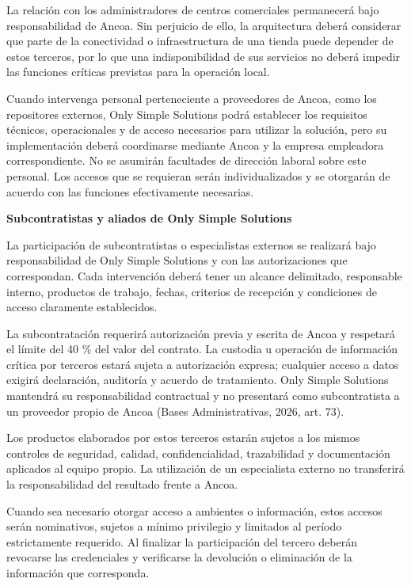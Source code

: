 \documentclass[11pt]{article}
\begin{document}
La relación con los administradores de centros comerciales permanecerá
bajo responsabilidad de Ancoa. Sin perjuicio de ello, la arquitectura
deberá considerar que parte de la conectividad o infraestructura de una
tienda puede depender de estos terceros, por lo que una indisponibilidad
de sus servicios no deberá impedir las funciones críticas previstas para
la operación local.

Cuando intervenga personal perteneciente a proveedores de Ancoa, como
los repositores externos, Only Simple Solutions podrá establecer los
requisitos técnicos, operacionales y de acceso necesarios para utilizar
la solución, pero su implementación deberá coordinarse mediante Ancoa y
la empresa empleadora correspondiente. No se asumirán facultades de
dirección laboral sobre este personal. Los accesos que se requieran
serán individualizados y se otorgarán de acuerdo con las funciones
efectivamente necesarias.

\textbf{Subcontratistas y aliados de Only Simple Solutions}

La participación de subcontratistas o especialistas externos se
realizará bajo responsabilidad de Only Simple Solutions y con las
autorizaciones que correspondan. Cada intervención deberá tener un
alcance delimitado, responsable interno, productos de trabajo, fechas,
criterios de recepción y condiciones de acceso claramente establecidos.

La subcontratación requerirá autorización previa y escrita de Ancoa y
respetará el límite del 40 \% del valor del contrato. La custodia u
operación de información crítica por terceros estará sujeta a
autorización expresa; cualquier acceso a datos exigirá declaración,
auditoría y acuerdo de tratamiento. Only Simple Solutions mantendrá su
responsabilidad contractual y no presentará como subcontratista a un
  proveedor propio de Ancoa (Bases Administrativas, 2026, art. 73).

Los productos elaborados por estos terceros estarán sujetos a los mismos
controles de seguridad, calidad, confidencialidad, trazabilidad y
documentación aplicados al equipo propio. La utilización de un
especialista externo no transferirá la responsabilidad del resultado
frente a Ancoa.

Cuando sea necesario otorgar acceso a ambientes o información, estos
accesos serán nominativos, sujetos a mínimo privilegio y limitados al
período estrictamente requerido. Al finalizar la participación del
tercero deberán revocarse las credenciales y verificarse la devolución o
eliminación de la información que corresponda.
\end{document}
